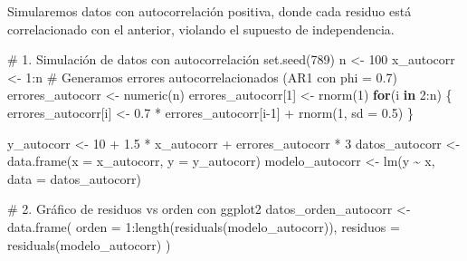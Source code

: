 \documentclass[
  letterpaper,
  DIV=11,
  numbers=noendperiod]{scrreprt}
\newenvironment{Shaded}{\begin{snugshade}}{\end{snugshade}}
\newcommand{\AttributeTok}[1]{\textcolor[rgb]{0.40,0.45,0.13}{#1}}
\newcommand{\CommentTok}[1]{\textcolor[rgb]{0.37,0.37,0.37}{#1}}
\newcommand{\ControlFlowTok}[1]{\textcolor[rgb]{0.00,0.23,0.31}{\textbf{#1}}}
\newcommand{\DecValTok}[1]{\textcolor[rgb]{0.68,0.00,0.00}{#1}}
\newcommand{\FloatTok}[1]{\textcolor[rgb]{0.68,0.00,0.00}{#1}}
\newcommand{\FunctionTok}[1]{\textcolor[rgb]{0.28,0.35,0.67}{#1}}
\newcommand{\NormalTok}[1]{\textcolor[rgb]{0.00,0.23,0.31}{#1}}
\newcommand{\OtherTok}[1]{\textcolor[rgb]{0.00,0.23,0.31}{#1}}
\newcommand{\SpecialCharTok}[1]{\textcolor[rgb]{0.37,0.37,0.37}{#1}}
\begin{document}
\begin{tcolorbox}[enhanced jigsaw, leftrule=.75mm, breakable, colbacktitle=quarto-callout-tip-color!10!white, bottomrule=.15mm, colframe=quarto-callout-tip-color-frame, toprule=.15mm, colback=white, coltitle=black, bottomtitle=1mm, left=2mm, title=\textcolor{quarto-callout-tip-color}{\faLightbulb}\hspace{0.5em}{Contraejemplo: Violación del supuesto de independencia}, opacityback=0, arc=.35mm, opacitybacktitle=0.6, toptitle=1mm, titlerule=0mm, rightrule=.15mm]

Simularemos datos con autocorrelación positiva, donde cada residuo está
correlacionado con el anterior, violando el supuesto de independencia.

\begin{Shaded}
\begin{Highlighting}[]
\CommentTok{\# 1. Simulación de datos con autocorrelación}
\FunctionTok{set.seed}\NormalTok{(}\DecValTok{789}\NormalTok{)}
\NormalTok{n }\OtherTok{\textless{}{-}} \DecValTok{100}
\NormalTok{x\_autocorr }\OtherTok{\textless{}{-}} \DecValTok{1}\SpecialCharTok{:}\NormalTok{n}
\CommentTok{\# Generamos errores autocorrelacionados (AR1 con phi = 0.7)}
\NormalTok{errores\_autocorr }\OtherTok{\textless{}{-}} \FunctionTok{numeric}\NormalTok{(n)}
\NormalTok{errores\_autocorr[}\DecValTok{1}\NormalTok{] }\OtherTok{\textless{}{-}} \FunctionTok{rnorm}\NormalTok{(}\DecValTok{1}\NormalTok{)}
\ControlFlowTok{for}\NormalTok{(i }\ControlFlowTok{in} \DecValTok{2}\SpecialCharTok{:}\NormalTok{n) \{}
\NormalTok{  errores\_autocorr[i] }\OtherTok{\textless{}{-}} \FloatTok{0.7} \SpecialCharTok{*}\NormalTok{ errores\_autocorr[i}\DecValTok{{-}1}\NormalTok{] }\SpecialCharTok{+} \FunctionTok{rnorm}\NormalTok{(}\DecValTok{1}\NormalTok{, }\AttributeTok{sd =} \FloatTok{0.5}\NormalTok{)}
\NormalTok{\}}

\NormalTok{y\_autocorr }\OtherTok{\textless{}{-}} \DecValTok{10} \SpecialCharTok{+} \FloatTok{1.5} \SpecialCharTok{*}\NormalTok{ x\_autocorr }\SpecialCharTok{+}\NormalTok{ errores\_autocorr }\SpecialCharTok{*} \DecValTok{3}
\NormalTok{datos\_autocorr }\OtherTok{\textless{}{-}} \FunctionTok{data.frame}\NormalTok{(}\AttributeTok{x =}\NormalTok{ x\_autocorr, }\AttributeTok{y =}\NormalTok{ y\_autocorr)}
\NormalTok{modelo\_autocorr }\OtherTok{\textless{}{-}} \FunctionTok{lm}\NormalTok{(y }\SpecialCharTok{\textasciitilde{}}\NormalTok{ x, }\AttributeTok{data =}\NormalTok{ datos\_autocorr)}

\CommentTok{\# 2. Gráfico de residuos vs orden con ggplot2}
\NormalTok{datos\_orden\_autocorr }\OtherTok{\textless{}{-}} \FunctionTok{data.frame}\NormalTok{(}
  \AttributeTok{orden =} \DecValTok{1}\SpecialCharTok{:}\FunctionTok{length}\NormalTok{(}\FunctionTok{residuals}\NormalTok{(modelo\_autocorr)),}
  \AttributeTok{residuos =} \FunctionTok{residuals}\NormalTok{(modelo\_autocorr)}
\NormalTok{)}


\end{Highlighting}
\end{Shaded}
\end{tcolorbox}
\end{document}
